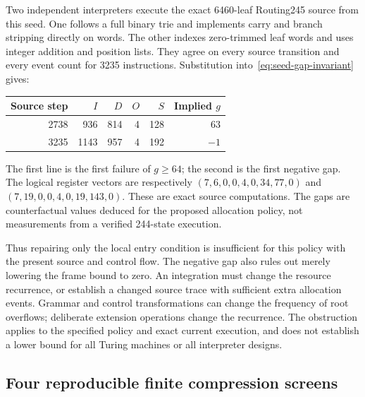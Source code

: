 Two independent interpreters execute the exact 6460-leaf Routing245
source from this seed.  One follows a full binary trie and implements
carry and branch stripping directly on words.  The other indexes
zero-trimmed leaf words and uses integer addition and position lists.
They agree on every source transition and every event count for 3235
instructions.  Substitution into~\eqref{eq:seed-gap-invariant} gives:
\begin{center}
\begin{tabular}{r|r|r|r|r|r}
Source step & $I$ & $D$ & $O$ & $S$ & Implied $g$\\
\hline
2738 & 936 & 814 & 4 & 128 & 63\\
3235 & 1143 & 957 & 4 & 192 & $-1$
\end{tabular}
\end{center}
The first line is the first failure of $g\ge64$; the second is the first
negative gap.  The logical register vectors are respectively
$(7,6,0,0,4,0,34,77,0)$ and $(7,19,0,0,4,0,19,143,0)$.
These are exact source computations.  The gaps are counterfactual values
deduced for the proposed allocation policy, not measurements from a
verified 244-state execution.

Thus repairing only the local entry condition is insufficient for this
policy with the present source and control flow.  The negative gap also
rules out merely lowering the frame bound to zero.  An integration must
change the resource recurrence, or establish a changed source trace with
sufficient extra allocation events.  Grammar and control transformations
can change the frequency of root overflows; deliberate extension
operations change the recurrence.  The obstruction applies to the
specified policy and exact current execution, and does not establish a
lower bound for all Turing machines or all interpreter designs.

\subsection{Four reproducible finite compression screens}

